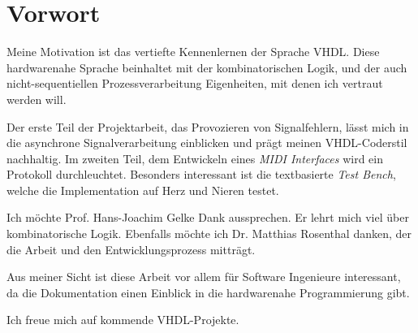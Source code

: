 
\chapter*{Vorwort}\label{chap.vorwort}

Meine Motivation ist das vertiefte Kennenlernen der Sprache VHDL. Diese hardwarenahe Sprache beinhaltet mit der kombinatorischen Logik, und der auch nicht-sequentiellen Prozessverarbeitung Eigen\-heiten, mit denen ich vertraut werden will. 

Der erste Teil der Projektarbeit, das Provozieren von Signalfehlern, lässt mich in die asynchrone Signalverarbeitung einblicken und prägt meinen VHDL-Coderstil nachhaltig. Im zweiten Teil, dem Entwickeln eines \textit{MIDI Interfaces} wird ein Protokoll durchleuchtet. Besonders interessant ist die textbasierte \textit{Test Bench}, welche die Implementation auf Herz und Nieren testet.

Ich möchte Prof. Hans-Joachim Gelke Dank aussprechen. Er lehrt mich viel über kombinatorische \-Logik. Ebenfalls möchte ich Dr. Matthias Rosenthal danken, der die Arbeit und den Entwicklungsprozess mitträgt.

Aus meiner Sicht ist diese Arbeit vor allem für Software Ingenieure interessant, da die Dokumentation einen  Einblick in die hardwarenahe Programmierung gibt.

Ich freue mich auf kommende VHDL-Projekte.
